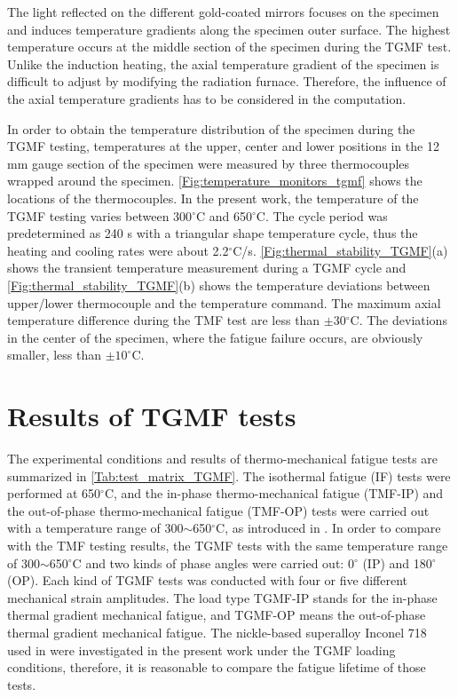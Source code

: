 \documentclass[preprint,5p,twocolumn,10pt,sort&compress]{elsarticle}
\begin{document}
The light reflected on the different gold-coated mirrors focuses on the specimen and induces temperature gradients along the specimen outer surface. The highest temperature occurs at the middle section of the specimen during the TGMF test.
Unlike the induction heating, the axial temperature gradient of the specimen is difficult to adjust by modifying the radiation furnace.
Therefore, the influence of the axial temperature gradients has to be considered in the computation.

In order to obtain the temperature distribution of the specimen during the TGMF testing, temperatures at the upper, center and lower positions in the 12 mm gauge section of the specimen were measured by three thermocouples wrapped around the specimen. \autoref{Fig:temperature_monitors_tgmf} shows the locations of the thermocouples. In the present work, the temperature of the TGMF testing varies between 300$^\circ$C and 650$^\circ$C. The cycle period was predetermined as 240 s with a triangular shape temperature cycle, thus the heating and cooling rates were about 2.2$^\circ$C/s.
\autoref{Fig:thermal_stability_TGMF}(a) shows the transient temperature measurement during a TGMF cycle and \autoref{Fig:thermal_stability_TGMF}(b) shows the temperature deviations between upper/lower thermocouple and the temperature command.
The maximum axial temperature difference during the TMF test are less than $\pm30$$^\circ$C. The deviations in the center of the specimen, where the fatigue failure occurs, are obviously smaller, less than $\pm 10^\circ$C. 


\section{Results of TGMF tests}

The experimental conditions and results of thermo-mechanical fatigue tests are summarized in \autoref{Tab:test_matrix_TGMF}. The isothermal fatigue (IF) tests were performed at 650$^\circ$C, and the in-phase thermo-mechanical fatigue (TMF-IP) and the out-of-phase thermo-mechanical fatigue (TMF-OP) tests were carried out with a temperature range of 300$\sim$650$^\circ$C, as introduced in \cite{SUN2019228, SUN201989}. In order to compare with the TMF testing results, the TGMF tests with the same temperature range of 300$\sim$650$^\circ$C and two kinds of phase angles were carried out: 0$^\circ$ (IP) and 180$^\circ$ (OP). Each kind of TGMF tests was conducted with four or five different mechanical strain amplitudes. The load type TGMF-IP stands for the in-phase thermal gradient mechanical fatigue, and TGMF-OP means the out-of-phase thermal gradient mechanical fatigue. The nickle-based superalloy Inconel 718 used in  \cite{SUN2019228, SUN201989} were investigated in the present work under the TGMF loading conditions, therefore, it is reasonable to compare the fatigue lifetime of those tests.
\end{document}
